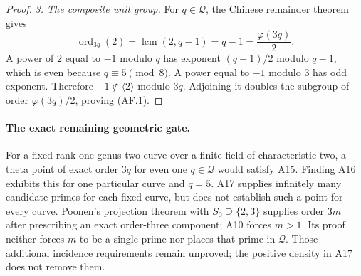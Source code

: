 \begin{proof}
\emph{3. The composite unit group.}
For $q\in\mathcal Q$, the Chinese remainder theorem gives
\[
 \operatorname{ord}_{3q}(2)
       =\operatorname{lcm}(2,q-1)=q-1=\frac{\varphi(3q)}2.
\]
A power of $2$ equal to $-1$ modulo $q$ has exponent
$(q-1)/2$ modulo $q-1$, which is even because $q\equiv5\pmod8$.
A power equal to $-1$ modulo $3$ has odd exponent. Therefore
$-1\notin\langle2\rangle$ modulo $3q$. Adjoining it doubles
the subgroup of order $\varphi(3q)/2$, proving (AF.1).
\end{proof}

\paragraph{The exact remaining geometric gate.}
For a fixed rank-one genus-two curve over a finite field of
characteristic two, a theta point of exact order $3q$ for even one
$q\in\mathcal Q$ would satisfy A15. Finding A16 exhibits this for
one particular curve and $q=5$. A17 supplies infinitely many
candidate primes for each fixed curve, but does not establish
such a point for every curve. Poonen's projection theorem with
$S_0\supseteq\{2,3\}$ supplies order $3m$ after prescribing an
exact order-three component; A10 forces $m>1$. Its proof neither
forces $m$ to be a single prime nor places that prime in
$\mathcal Q$. Those additional incidence requirements remain
unproved; the positive density in A17 does not remove them.
